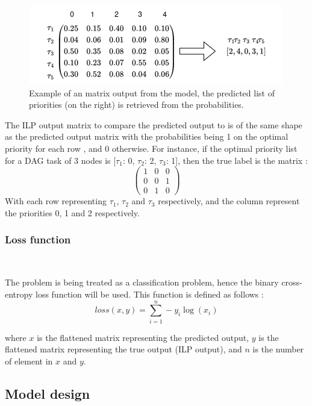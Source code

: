 \begin{figure}
    \centering
    \includegraphics[width=\linewidth]{images/output_matrix_example.drawio.png}
    \caption{Example of an matrix output from the model, the predicted list of priorities (on the right)
    is retrieved from the probabilities.}
    \label{fig:dag_output_matrix_example}
\end{figure}

The ILP output matrix to compare the predicted output to is of the same shape
as the predicted output matrix with the probabilities being 1 on the optimal priority for each row 
, and 0 otherwise. For instance, if the optimal priority list for a DAG task of 3 nodes 
is [$\tau_1$: 0, $\tau_2$: 2, $\tau_3$: 1],
then the true label is the matrix :
$$
\begin{pmatrix}
    1 & 0 & 0\\
    0 & 0 & 1\\
    0 & 1 & 0
\end{pmatrix}
$$
With each row representing $\tau_1$, $\tau_2$ and $\tau_3$ respectively,
and the column represent the priorities 0, 1 and 2 respectively.
\subsubsection{Loss function}
~

The problem is being treated as a classification problem,
hence the binary cross-entropy loss function will be used.
This function is defined as follows :
\begin{equation}
    loss(x, y) = \sum_{i=1}^{n} -y_i\log(x_i)
\end{equation}
    
where $x$ is the flattened matrix representing the predicted output,
$y$ is the flattened matrix representing the true output (ILP output),
and $n$ is the number of element in $x$ and $y$.


\subsection{Model design}
~


